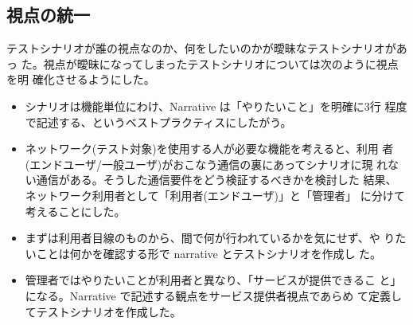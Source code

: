   \subsection{視点の統一}
テストシナリオが誰の視点なのか、何をしたいのかが曖昧なテストシナリオがあっ
た。視点が曖昧になってしまったテストシナリオについては次のように視点を明
確化させるようにした。
\begin{itemize}
 \item シナリオは機能単位にわけ、Narrative は「やりたいこと」を明確に3行
       程度で記述する、というベストプラクティスにしたがう。
 \item ネットワーク(テスト対象)を使用する人が必要な機能を考えると、利用
       者(エンドユーザ/一般ユーザ)がおこなう通信の裏にあってシナリオに現
       れない通信がある。そうした通信要件をどう検証するべきかを検討した
       結果、ネットワーク利用者として「利用者(エンドユーザ)」と「管理者」
       に分けて考えることにした。
 \item まずは利用者目線のものから、間で何が行われているかを気にせず、や
       りたいことは何かを確認する形で narrative とテストシナリオを作成し
       た。
 \item 管理者ではやりたいことが利用者と異なり、「サービスが提供できるこ
       と」になる。Narrative で記述する観点をサービス提供者視点であらめ
       て定義してテストシナリオを作成した。
\end{itemize}

